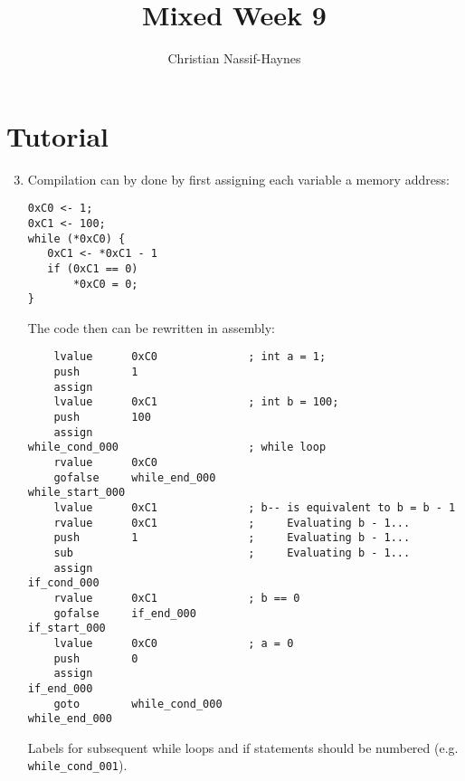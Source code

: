 \documentclass[a4paper]{article}
\begin{document}
	\title{Mixed Week 9}
	\author{Christian Nassif-Haynes}
	\maketitle
	
	\section*{Tutorial}
	\begin{enumerate}
		\setcounter{enumi}{2}
		\item Compilation can by done by first assigning each variable a memory address:
		\begin{verbatim}
0xC0 <- 1;
0xC1 <- 100;
while (*0xC0) {
   0xC1 <- *0xC1 - 1
   if (0xC1 == 0)
       *0xC0 = 0;
}
		\end{verbatim}
		The code then can be rewritten in assembly:
		\begin{verbatim}
    lvalue      0xC0              ; int a = 1;
    push        1
    assign
    lvalue      0xC1              ; int b = 100;
    push        100
    assign
while_cond_000                    ; while loop
    rvalue      0xC0
    gofalse     while_end_000
while_start_000
    lvalue      0xC1              ; b-- is equivalent to b = b - 1
    rvalue      0xC1              ;     Evaluating b - 1...
    push        1                 ;     Evaluating b - 1...
    sub                           ;     Evaluating b - 1...
    assign
if_cond_000
    rvalue      0xC1              ; b == 0
    gofalse     if_end_000
if_start_000
    lvalue      0xC0              ; a = 0
    push        0
    assign
if_end_000
    goto        while_cond_000
while_end_000
		\end{verbatim}
		Labels for subsequent while loops and if statements should be numbered  (e.g. \verb=while_cond_001=).
	\end{enumerate}
\end{document}
